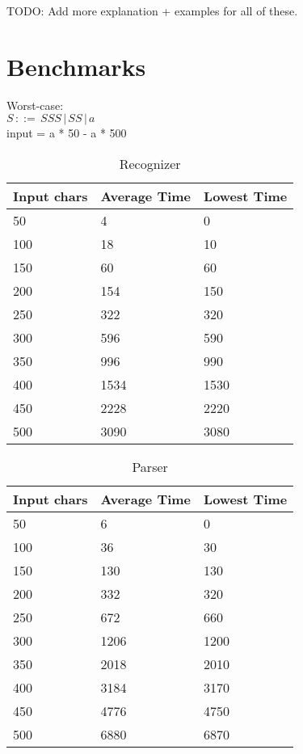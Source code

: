 \documentclass[a4paper,10pt]{article}
\begin{document}
TODO: Add more explanation + examples for all of these.\\


\section{Benchmarks}

Worst-case:\\
$S\,::=\,SSS\,|\,SS\,|\,a$\\
input = a * 50 - a * 500\\

\begin{table}
\centering
\begin{tabular}{ | p{5em} | p{7em} | p{6em} | }
  \hline
  Input chars & Average Time & Lowest Time \\
  \hline
  50 & 4 & 0 \\
  100 & 18 & 10 \\
  150 & 60 & 60 \\
  200 & 154 & 150 \\
  250 & 322 & 320 \\
  300 & 596 & 590 \\
  350 & 996 & 990 \\
  400 & 1534 & 1530 \\
  450 & 2228 & 2220 \\
  500 & 3090 & 3080 \\
  \hline
\end{tabular}
\caption{Recognizer}
\end{table}

\begin{table}
\centering
\begin{tabular}{ | p{5em} | p{7em} | p{6em} | }
  \hline
  Input chars & Average Time & Lowest Time \\
  \hline
  50 & 6 & 0 \\
  100 & 36 & 30 \\
  150 & 130 & 130 \\
  200 & 332 & 320 \\
  250 & 672 & 660 \\
  300 & 1206 & 1200 \\
  350 & 2018 & 2010 \\
  400 & 3184 & 3170 \\
  450 & 4776 & 4750 \\
  500 & 6880 & 6870 \\
  \hline
\end{tabular}
\caption{Parser}
\end{table}
\end{document}

